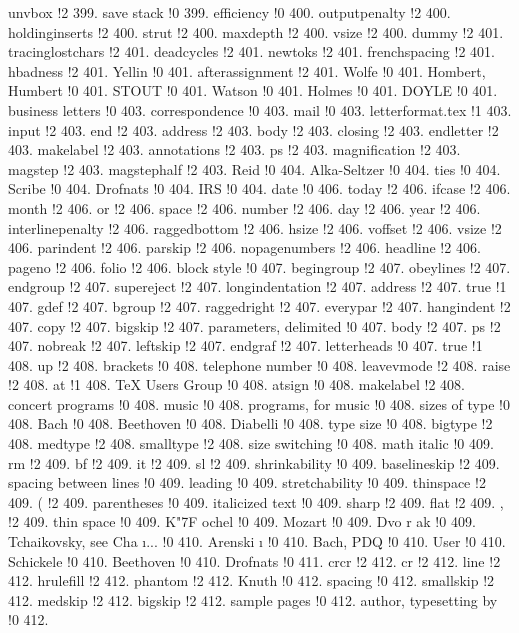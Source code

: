unvbox !2 399.
save stack !0 399.
efficiency !0 400.
outputpenalty !2 400.
holdinginserts !2 400.
strut !2 400.
maxdepth !2 400.
vsize !2 400.
dummy !2 401.
tracinglostchars !2 401.
deadcycles !2 401.
newtoks !2 401.
frenchspacing !2 401.
hbadness !2 401.
Yellin !0 401.
afterassignment !2 401.
Wolfe !0 401.
Hombert, Humbert !0 401.
STOUT !0 401.
Watson !0 401.
Holmes !0 401.
DOYLE !0 401.
business letters !0 403.
correspondence !0 403.
mail !0 403.
letterformat.tex !1 403.
input !2 403.
end !2 403.
address !2 403.
body !2 403.
closing !2 403.
endletter !2 403.
makelabel !2 403.
annotations !2 403.
ps !2 403.
magnification !2 403.
magstep !2 403.
magstephalf !2 403.
Reid !0 404.
Alka-Seltzer !0 404.
ties !0 404.
Scribe !0 404.
Drofnats !0 404.
IRS !0 404.
date !0 406.
today !2 406.
ifcase !2 406.
month !2 406.
or !2 406.
space !2 406.
number !2 406.
day !2 406.
year !2 406.
interlinepenalty !2 406.
raggedbottom !2 406.
hsize !2 406.
voffset !2 406.
vsize !2 406.
parindent !2 406.
parskip !2 406.
nopagenumbers !2 406.
headline !2 406.
pageno !2 406.
folio !2 406.
block style !0 407.
begingroup !2 407.
obeylines !2 407.
endgroup !2 407.
supereject !2 407.
longindentation !2 407.
address !2 407.
true !1 407.
gdef !2 407.
bgroup !2 407.
raggedright !2 407.
everypar !2 407.
hangindent !2 407.
copy !2 407.
bigskip !2 407.
parameters, delimited !0 407.
body !2 407.
ps !2 407.
nobreak !2 407.
leftskip !2 407.
endgraf !2 407.
letterheads !0 407.
true !1 408.
up !2 408.
brackets !0 408.
telephone number !0 408.
leavevmode !2 408.
raise !2 408.
at !1 408.
TeX Users Group !0 408.
atsign !0 408.
makelabel !2 408.
concert programs !0 408.
music !0 408.
programs, for music !0 408.
sizes of type !0 408.
Bach !0 408.
Beethoven !0 408.
Diabelli !0 408.
type size !0 408.
bigtype !2 408.
medtype !2 408.
smalltype !2 408.
size switching !0 408.
math italic !0 409.
rm !2 409.
bf !2 409.
it !2 409.
sl !2 409.
shrinkability !0 409.
baselineskip !2 409.
spacing between lines !0 409.
leading !0 409.
stretchability !0 409.
thinspace !2 409.
( !2 409.
parentheses !0 409.
italicized text !0 409.
sharp !2 409.
flat !2 409.
, !2 409.
thin space !0 409.
K{\accent "7F o}chel !0 409.
Mozart !0 409.
Dvo{ r}{ a}k !0 409.
Tchaikovsky, see Cha{ \i }... !0 410.
Arenski{ \i } !0 410.
Bach, PDQ !0 410.
User !0 410.
Schickele !0 410.
Beethoven !0 410.
Drofnats !0 411.
crcr !2 412.
cr !2 412.
line !2 412.
hrulefill !2 412.
phantom !2 412.
Knuth !0 412.
spacing !0 412.
smallskip !2 412.
medskip !2 412.
bigskip !2 412.
sample pages !0 412.
author, typesetting by !0 412.
